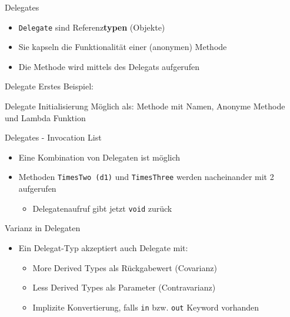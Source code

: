 \documentclass[11pt]{beamer}
\begin{document}

\begin{frame}{Delegates}
\begin{itemize}
 	\item \texttt{Delegate} sind Referenz\textbf{typen} (Objekte)
 	\item Sie kapseln die Funktionalität einer (anonymen) Methode
 	\item Die Methode wird mittels des Delegats aufgerufen
\end{itemize}
	
\end{frame}
\begin{frame}{Delegate}
	Erstes Beispiel:
\end{frame}

\begin{frame}{Delegate}
	Initialisierung Möglich als: Methode mit Namen, Anonyme Methode und Lambda Funktion
\end{frame}

\begin{frame}{Delegates - Invocation List}
	\begin{itemize}
		\item  Eine Kombination von Delegaten ist möglich
		\item Methoden \texttt{TimesTwo (d1)} und \texttt{TimesThree} werden nacheinander mit 2 aufgerufen
		\begin{itemize}
			\item Delegatenaufruf gibt jetzt \texttt{void} zurück
		\end{itemize}
	\end{itemize}
\end{frame}

\begin{frame}{Varianz in Delegaten}
	\begin{itemize}
	 	\item Ein Delegat-Typ akzeptiert auch Delegate mit:
	 	\begin{itemize}
	 		\item \glqq More Derived Types\grqq{} als Rückgabewert (Covarianz)
	 		\item \glqq Less Derived Types\grqq{} als Parameter (Contravarianz)
	 		\item Implizite Konvertierung, falls \texttt{in} bzw. \texttt{out} Keyword vorhanden
	 	\end{itemize}
	\end{itemize}
\end{frame}
\end{document}

